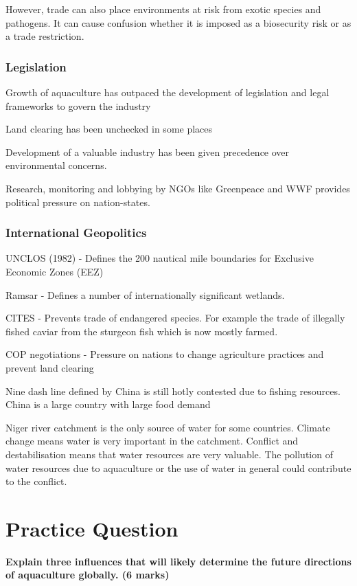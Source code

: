 				However, trade can also place environments at risk from exotic species and pathogens. It can cause confusion whether it is imposed as a biosecurity risk or as a trade restriction.

			\subsubsection{Legislation}
				Growth of aquaculture has outpaced the development of legislation and legal frameworks to govern the industry

				Land clearing has been unchecked in some places

				Development of a valuable industry has been given precedence over environmental concerns.

				Research, monitoring and lobbying by NGOs like Greenpeace and WWF provides political pressure on nation-states.

			\subsubsection{International Geopolitics}
				UNCLOS (1982) - Defines the 200 nautical mile boundaries for Exclusive Economic Zones (EEZ)

				Ramsar - Defines a number of internationally significant wetlands.

				CITES - Prevents trade of endangered species. For example the trade of illegally fished caviar from the sturgeon fish which is now mostly farmed.

				COP negotiations - Pressure on nations to change agriculture practices and prevent land clearing

				Nine dash line defined by China is still hotly contested due to fishing resources. China is a large country with large food demand

				Niger river catchment is the only source of water for some countries. Climate change means water is very important in the catchment. Conflict and destabilisation means that water resources are very valuable. The pollution of water resources due to aquaculture or the use of water in general could contribute to the conflict.

\newpage
\section{Practice Question}
	\textbf{Explain three influences that will likely determine the future directions of aquaculture globally. (6 marks)}

